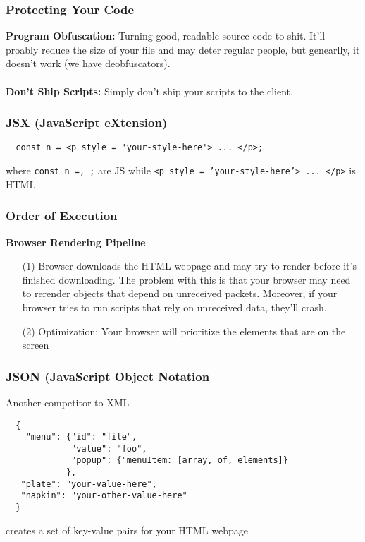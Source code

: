\documentclass[13pt]{article}
\begin{document}
\subsubsection{Protecting Your Code}
\textbf{Program Obfuscation:} Turning good, readable source code to shit. It'll proably reduce the size of your file and may deter regular people, but genearlly, it doesn't work (we have deobfuscators).  \\ \\
\textbf{Don't Ship Scripts:} Simply don't ship your scripts to the client.

\subsubsection{JSX (JavaScript eXtension)}
\begin{verbatim}
  const n = <p style = 'your-style-here'> ... </p>;
\end{verbatim}
where \texttt{const n =, ;} are JS while \texttt{<p style = 'your-style-here'> ... </p>} is HTML

\subsubsection{Order of Execution}
\textbf{Browser Rendering Pipeline}
\begin{itemize}[leftmargin = 0pt]
\item [(1)] Browser downloads the HTML webpage and may try to render before it's finished downloading. The problem with this is that your browser may need to rerender objects that depend on unreceived packets. Moreover, if your browser tries to run scripts that rely on unreceived data, they'll crash.
\item [(2)] Optimization: Your browser will prioritize the elements that are on the screen
\end{itemize}

\subsubsection{JSON (JavaScript Object Notation}
Another competitor to XML
\begin{verbatim}
  {
    "menu": {"id": "file",
             "value": "foo",
             "popup": {"menuItem: [array, of, elements]}
            },
   "plate": "your-value-here",
   "napkin": "your-other-value-here"
  } \end{verbatim}  
creates a set of key-value pairs for your HTML webpage
\end{document}
